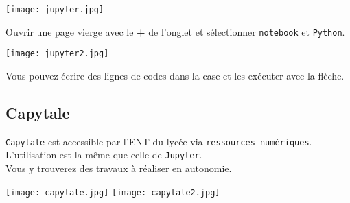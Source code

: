 \begin{center}
\texttt{[image: jupyter.jpg]}
\end{center}

Ouvrir une page vierge avec le \textbf{+} de l'onglet et sélectionner \texttt{notebook} et \texttt{Python}.


\begin{center}
\texttt{[image: jupyter2.jpg]}
\end{center}

Vous pouvez écrire des lignes de codes dans la case et les exécuter avec la flèche.

\subsection{Capytale}

\texttt{Capytale} est accessible par l'ENT du lycée via \texttt{ressources numériques}. L'utilisation est la même que celle de \texttt{Jupyter}.\\
Vous y trouverez des travaux à réaliser en autonomie.

\begin{center}
\texttt{[image: capytale.jpg]}
\texttt{[image: capytale2.jpg]}
\end{center}

